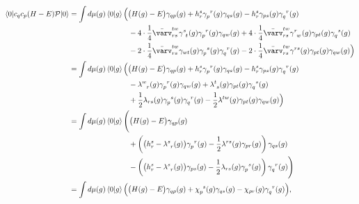\documentclass[11pt,letterpaper]{article}
\begin{document}
%
\begin{subequations}
\begin{align}
  \nonumber
  \braket{0|c_q c_p (H - E) \mathcal{P} |0}
  &= \int d\mu(g) \braket{0|g}
  \Bigl(
    \big(H(g) - E\big) \gamma_{qp}(g)
    + h^{s}_{r} \gamma^{\phantom{p}r}_{p\phantom{r}}(g) \gamma_{qs}(g)
    - h^{s}_{r} \gamma_{ps}(g) \gamma^{\phantom{q}r}_{q\phantom{r}}(g)\\
    \nonumber
    &\hspace{8em}
    - 4 \cdot \frac{1}{4} \bar\varv^{tw}_{rs}
    \gamma_{\phantom{s}t}^{s\phantom{t}}(g)
    \gamma_{p\phantom{r}}^{\phantom{p}r}(g)
    \gamma_{qw}(g)
    + 4 \cdot \frac{1}{4} \bar\varv^{tw}_{rs}
    \gamma_{\phantom{r}w}^{r\phantom{w}}(g)
    \gamma_{pt}(g)
    \gamma_{q\phantom{s}}^{\phantom{q}s}(g)\\
    &\hspace{8em}
    - 2 \cdot \frac{1}{4} \bar\varv^{tw}_{rs}
    \gamma_{wt}(g)
    \gamma_{p\phantom{s}}^{\phantom{p}s}(g) 
    \gamma_{q\phantom{r}}^{\phantom{q}r}(g)
    - 2 \cdot \frac{1}{4} \bar\varv^{tw}_{rs}
    \gamma^{rs}(g)
    \gamma_{pt}(g)
    \gamma_{qw}(g)
  \Bigr)\\
  \nonumber
  &= \int d\mu(g) \braket{0|g}
  \Bigl(
    \big(H(g) - E\big) \gamma_{qp}(g)
    + h^{s}_{r} \gamma^{\phantom{p}r}_{p\phantom{r}}(g) \gamma_{qs}(g)
    - h^{s}_{r} \gamma_{ps}(g) \gamma^{\phantom{q}r}_{q\phantom{r}}(g)\\
    \nonumber
    &\hspace{8em}
    - \lambda^{w\phantom{r}}_{\phantom{w}r}(g) 
    \gamma^{\phantom{p}r}_{p\phantom{r}}(g) \gamma_{qw}(g) 
    + \lambda^{t\phantom{s}}_{\phantom{t}s}(g) 
    \gamma_{pt}(g) \gamma_{q\phantom{s}}^{\phantom{q}s}(g)\\
    &\hspace{8em}+ \frac{1}{2} \lambda_{rs}(g)
    \gamma_{p\phantom{s}}^{\phantom{p}s}(g)
    \gamma_{q\phantom{r}}^{\phantom{q}r}(g)
    - \frac{1}{2} \lambda^{tw}(g)
    \gamma_{pt}(g)
    \gamma_{qw}(g)
  \Bigr)\\
  \nonumber
  &= \int d\mu(g) \braket{0|g}
  \Biggl(
    \big(H(g) - E\big) \gamma_{qp}(g)\\
    \nonumber
    &\hspace{8em}
    + \left(
      \big(h_r^s - \lambda^{s\phantom{r}}_{\phantom{s}r}(g)\big)
      \gamma_{p\phantom{r}}^{\phantom{p}r}(g)
      - \frac{1}{2} \lambda^{rs}(g) \gamma_{pr}(g)
    \right)
    \gamma_{qs}(g)\\
    &\hspace{8em}
    - \left(
      \big(h_r^s - \lambda^{s\phantom{r}}_{\phantom{s}r}(g)\big)
      \gamma_{ps}(g)
      - \frac{1}{2} \lambda_{rs}(g) \gamma_{p\phantom{s}}^{\phantom{p}s}(g)
    \right)
    \gamma_{q\phantom{r}}^{\phantom{q}r}(g)
  \Biggr)\\
  &= \int d\mu(g) \braket{0|g}
  \Big(
    \big(H(g) - E\big) \gamma_{qp}(g)
    + \chi_{p\phantom{s}}^{\phantom{p}s}(g) \gamma_{qs}(g)
    - \chi_{pr}(g) \gamma_{q\phantom{r}}^{\phantom{q}r}(g)
  \Big),
\end{align}
\end{subequations}
\end{document}
